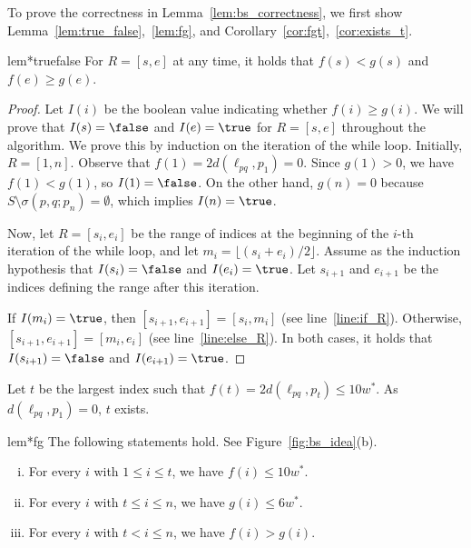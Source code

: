 To prove the correctness in Lemma~\ref{lem:bs_correctness}, we first show Lemma~\ref{lem:true_false},~\ref{lem:fg}, and Corollary~\ref{cor:fgt},~\ref{cor:exists_t}.






\begin{restatable}{lem*}{truefalse}
    \label{lem:true_false}
    For $R = [s, e]$ at any time, it holds that $f(s)< g(s)$ and $f(e) \ge g(e)$.
\end{restatable}


\begin{proof}
    Let $I(i)$ be the boolean value indicating whether $f(i) \ge g(i)$.
    We will prove that $I(s) = \false$ and $I(e) = \true$ for $R = [s, e]$ throughout the algorithm.
    We prove this by induction on the iteration of the while loop.
    Initially, $R = [1, n]$.
    Observe that $f(1) = 2d(\ell_{pq}, p_1) = 0$.
    Since $g(1) > 0$, we have $f(1) < g(1)$, so $I(1) = \false$.
    On the other hand, $g(n) = 0$ because $S \setminus \sigma(p, q; p_n) = \emptyset$, which implies $I(n) = \true$.
    
    Now, let $R = [s_i, e_i]$ be the range of indices at the beginning of the $i$-th iteration of the while loop, and let $m_i = \lfloor (s_i + e_i)/2 \rfloor$.
    Assume as the induction hypothesis that $I(s_i) = \false$ and $I(e_i) = \true$.
    Let $s_{i+1}$ and $e_{i+1}$ be the indices defining the range after this iteration.
    
    If $I(m_i) = \true$, then $[s_{i+1}, e_{i+1}] = [s_i, m_i]$ (see line~\ref{line:if_R}).
    Otherwise, $[s_{i+1}, e_{i+1}] = [m_i, e_i]$ (see line~\ref{line:else_R}).
    In both cases, it holds that $I(s_{i+1}) = \false$ and $I(e_{i+1}) = \true$.
\end{proof}


Let $t$ be the largest index such that $f(t) = 2d(\ell_{pq}, p_t) \le 10w^*$.
As $d(\ell_{pq}, p_1) = 0$, $t$ exists.

\begin{restatable}{lem*}{fg}
    \label{lem:fg}
    The following statements hold. See Figure~\ref{fig:bs_idea}(b).
    \begin{enumerate}[(i)]
        \item For every $i$ with $1\le i \le t$, we have $f(i) \le 10w^*$. 
        \item For every $i$ with $t\le i \le n$, 
    we have $g(i) \le 6w^*$. 
        \item For every $i$ with $t < i \le n$, we have $f(i) > g(i)$. 
    \end{enumerate}
\end{restatable}



